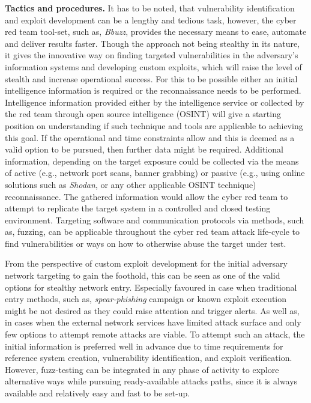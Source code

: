 \textbf{Tactics and procedures.}
It has to be noted, that vulnerability identification and exploit development can be a lengthy and tedious task, however, the cyber red team tool-set, such as, \textit{Bbuzz}, provides the necessary means to ease, automate and deliver results faster. Though the approach not being stealthy in its nature, it gives the innovative way on finding targeted vulnerabilities in the adversary's information systems and developing custom exploits, which will raise the level of stealth and increase operational success.
For this to be possible either an initial intelligence information is required or the reconnaissance needs to be performed. Intelligence information provided either by the intelligence service or collected by the red team through open source intelligence (OSINT) will give a starting position on understanding if such technique and tools are applicable to achieving this goal. If the operational and time constraints allow and this is deemed as a valid option to be pursued, then further data might be required. Additional information, depending on the target exposure could be collected via the means of active (e.g., network port scans, banner grabbing) or passive (e.g., using online solutions such as \textit{Shodan}, or any other applicable OSINT technique) reconnaissance. The gathered information would allow the cyber red team to attempt to replicate the target system in a controlled and closed testing environment.
Targeting software and communication protocols via methods, such as, fuzzing, can be applicable throughout the cyber red team attack life-cycle to find vulnerabilities or ways on how to otherwise abuse the target under test.

From the perspective of custom exploit development for the initial adversary network targeting to gain the foothold, this can be seen as one of the valid options for stealthy network entry. Especially favoured in case when traditional entry methods, such as, \textit{spear-phishing} campaign or known exploit execution might be not desired as they could raise attention and trigger alerts. As well as, in cases when the external network services have limited attack surface and only few options to attempt remote attacks are viable.
To attempt such an attack, the initial information is preferred well in advance due to time requirements for reference system creation, vulnerability identification, and exploit verification. However, fuzz-testing can be integrated in any phase of activity to explore alternative ways while pursuing ready-available attacks paths, since it is always available and relatively easy and fast to be set-up.


